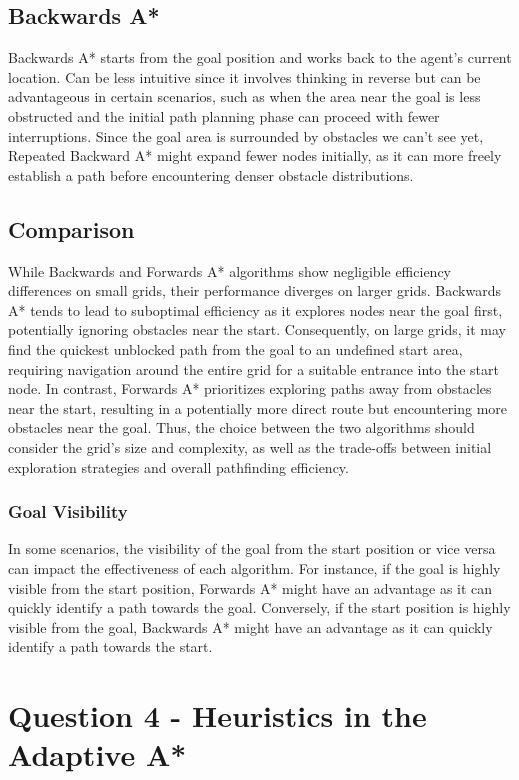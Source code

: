 \documentclass{article}
\begin{document}
\subsection{Backwards A*}
Backwards A* starts from the goal position and works back to the agent's current location. Can be less intuitive since it involves thinking in reverse but can be advantageous in certain scenarios, such as when the area near the goal is less obstructed and the initial path planning phase can proceed with fewer interruptions. Since the goal area is surrounded by obstacles we can't see yet, Repeated Backward A* might expand fewer nodes initially, as it can more freely establish a path before encountering denser obstacle distributions. 

\subsection{Comparison}
While Backwards and Forwards A* algorithms show negligible efficiency differences on small grids, their performance diverges on larger grids. Backwards A* tends to lead to suboptimal efficiency as it explores nodes near the goal first, potentially ignoring obstacles near the start. Consequently, on large grids, it may find the quickest unblocked path from the goal to an undefined start area, requiring navigation around the entire grid for a suitable entrance into the start node. In contrast, Forwards A* prioritizes exploring paths away from obstacles near the start, resulting in a potentially more direct route but encountering more obstacles near the goal. Thus, the choice between the two algorithms should consider the grid's size and complexity, as well as the trade-offs between initial exploration strategies and overall pathfinding efficiency.

\subsubsection{Goal Visibility}
In some scenarios, the visibility of the goal from the start position or vice versa can impact the effectiveness of each algorithm. For instance, if the goal is highly visible from the start position, Forwards A* might have an advantage as it can quickly identify a path towards the goal. Conversely, if the start position is highly visible from the goal, Backwards A* might have an advantage as it can quickly identify a path towards the start.

\section{Question 4 - Heuristics in the Adaptive A*}
\end{document}
